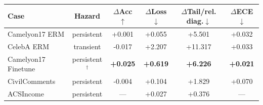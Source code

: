 \begin{tabular}{@{}lccccc@{}}
  \toprule
  Case & Hazard & $\Delta$Acc$\uparrow$ & $\Delta$Loss$\downarrow$ & $\Delta$Tail/rel. diag.$\downarrow$ & $\Delta$ECE$\downarrow$ \\
  \midrule
  Camelyon17 ERM & persistent & +0.001 & +0.055 & +5.501 & +0.032 \\
  CelebA ERM & transient & -0.017 & +2.207 & +11.317 & +0.033 \\
  Camelyon17 Finetune & persistent$^{\dagger}$ & \textbf{+0.025} & \textbf{+0.619} & \textbf{+6.226} & \textbf{+0.021} \\
  CivilComments & persistent & -0.004 & +0.104 & +1.829 & +0.070 \\
  ACSIncome & persistent & --- & +0.027 & +0.376 & --- \\
  \bottomrule
\end{tabular}
